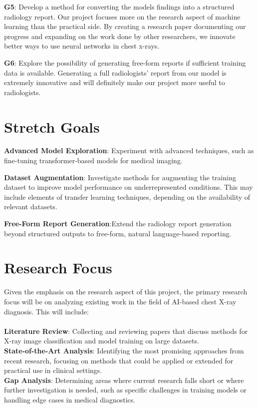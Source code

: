 \documentclass{article}
\begin{document}
\begin{itemize}
\begin{item}
    \textbf{G5}: Develop a method for converting the models findings into a structured radiology report. Our project focuses more on the research aspect of machine learning than the 
    practical side. By creating a research paper documenting our progress and expanding on the 
    work done by other researchers, we innovate better ways to use neural networks in chest 
    x-rays.
\end{item}
\begin{item}
    \textbf{G6}: Explore the possibility of generating free-form reports if sufficient training data is available. Generating a full radiologists' report from our model is extremely 
    innovative and will definitely make our project more useful to radiologists.
\end{item}
\end{itemize}

\section{Stretch Goals}

\begin{itemize}
\begin{item}
    \textbf{Advanced Model Exploration}: Experiment with advanced techniques, such as fine-tuning transformer-based models for medical imaging.
\end{item}
\begin{item} 
    \textbf{Dataset Augmentation}: Investigate methods for augmenting the training dataset to improve model performance on underrepresented conditions. This may include elements of transfer learning techniques, depending on the availability of relevant datasets.
\end{item}
\begin{item} 
    \textbf{Free-Form Report Generation}:Extend the radiology report generation beyond structured outputs to free-form, natural language-based reporting.
\end{item}
\end{itemize}

\section{Research Focus}
Given the emphasis on the research aspect of this project, the primary research focus will be on analyzing existing work in the field of AI-based chest X-ray diagnosis. This will include:\\\\
\textbf{Literature Review}: Collecting and reviewing papers that discuss methods for X-ray image classification and model training on large datasets.\\
\textbf{State-of-the-Art Analysis}: Identifying the most promising approaches from recent research, focusing on methods that could be applied or extended for practical use in clinical settings.\\
\textbf{Gap Analysis}: Determining areas where current research falls short or where further investigation is needed, such as specific challenges in training models or handling edge cases in medical diagnostics.\\
\end{document}
